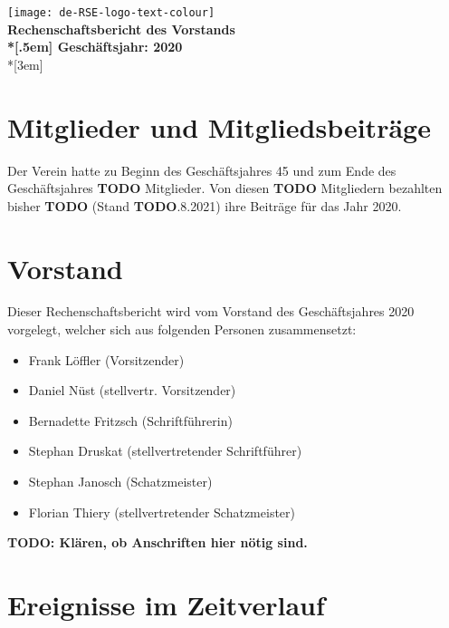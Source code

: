 \newcommand{\jahr}{2020}



\thispagestyle{empty}

\begin{centering}
\texttt{[image: de-RSE-logo-text-colour]}\\
\vspace{3em}
\textbf{
 \Large Rechenschaftsbericht des Vorstands\\*[.5em]
 \normalsize Geschäftsjahr: \jahr}\\*[3em]
\end{centering}

\section{Mitglieder und Mitgliedsbeiträge}

Der Verein hatte zu Beginn des Geschäftsjahres 45 und zum Ende des Geschäftsjahres \textbf{TODO} Mitglieder. Von diesen \textbf{TODO} Mitgliedern bezahlten bisher \textbf{TODO} (Stand  \textbf{TODO}.8.2021) ihre Beiträge für das Jahr 2020.

\section{Vorstand}

Dieser Rechenschaftsbericht wird vom Vorstand des Geschäftsjahres 2020 vorgelegt, welcher sich aus folgenden Personen zusammensetzt:

\begin{itemize}
  \setlength{\itemsep}{0pt plus 1pt}
  \item Frank Löffler (Vorsitzender)
  \item Daniel Nüst (stellvertr. Vorsitzender)
  \item Bernadette Fritzsch (Schriftführerin)
  \item Stephan Druskat (stellvertretender Schriftführer)
  \item Stephan Janosch (Schatzmeister)
  \item Florian Thiery (stellvertretender Schatzmeister)
\end{itemize}

\textbf{TODO: Klären, ob Anschriften hier nötig sind.}

\section{Ereignisse im Zeitverlauf}

